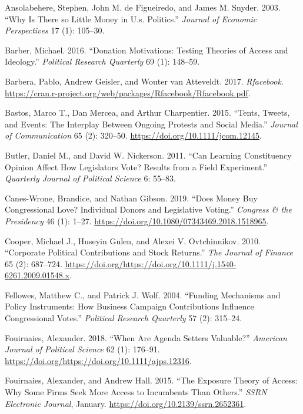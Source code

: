 \documentclass[12pt,]{article}
\begin{document}
\leavevmode\hypertarget{ref-ansolabehere2003}{}%
Ansolabehere, Stephen, John M. de Figueiredo, and James M. Snyder. 2003.
``Why Is There so Little Money in U.s. Politics.'' \emph{Journal of
Economic Perspectives} 17 (1): 105--30.

\leavevmode\hypertarget{ref-barber2016}{}%
Barber, Michael. 2016. ``Donation Motivations: Testing Theories of
Access and Ideology.'' \emph{Political Research Quarterly} 69 (1):
148--59.

\leavevmode\hypertarget{ref-rfacebook}{}%
Barbera, Pablo, Andrew Geisler, and Wouter van Atteveldt. 2017.
\emph{Rfacebook}.
\url{https://cran.r-project.org/web/packages/Rfacebook/Rfacebook.pdf}.

\leavevmode\hypertarget{ref-bastos2015}{}%
Bastos, Marco T., Dan Mercea, and Arthur Charpentier. 2015. ``Tents,
Tweets, and Events: The Interplay Between Ongoing Protests and Social
Media.'' \emph{Journal of Communication} 65 (2): 320--50.
\url{https://doi.org/10.1111/jcom.12145}.

\leavevmode\hypertarget{ref-butler2011}{}%
Butler, Daniel M., and David W. Nickerson. 2011. ``Can Learning
Constituency Opinion Affect How Legislators Vote? Results from a Field
Experiment.'' \emph{Quarterly Journal of Political Science} 6: 55--83.

\leavevmode\hypertarget{ref-caneswrone2019}{}%
Canes-Wrone, Brandice, and Nathan Gibson. 2019. ``Does Money Buy
Congressional Love? Individual Donors and Legislative Voting.''
\emph{Congress \& the Presidency} 46 (1): 1--27.
\url{https://doi.org/10.1080/07343469.2018.1518965}.

\leavevmode\hypertarget{ref-cooper2010}{}%
Cooper, Michael J., Huseyin Gulen, and Alexei V. Ovtchinnikov. 2010.
``Corporate Political Contributions and Stock Returns.'' \emph{The
Journal of Finance} 65 (2): 687--724.
\url{https://doi.org/https://doi.org/10.1111/j.1540-6261.2009.01548.x}.

\leavevmode\hypertarget{ref-fellowes2004}{}%
Fellowes, Matthew C., and Patrick J. Wolf. 2004. ``Funding Mechanisms
and Policy Instruments: How Business Campaign Contributions Influence
Congressional Votes.'' \emph{Political Research Quarterly} 57 (2):
315--24.

\leavevmode\hypertarget{ref-fouirnaies2018}{}%
Fouirnaies, Alexander. 2018. ``When Are Agenda Setters Valuable?''
\emph{American Journal of Political Science} 62 (1): 176--91.
\url{https://doi.org/https://doi.org/10.1111/ajps.12316}.

\leavevmode\hypertarget{ref-fouirnaies2015}{}%
Fouirnaies, Alexander, and Andrew Hall. 2015. ``The Exposure Theory of
Access: Why Some Firms Seek More Access to Incumbents Than Others.''
\emph{SSRN Electronic Journal}, January.
\url{https://doi.org/10.2139/ssrn.2652361}.
\end{document}
